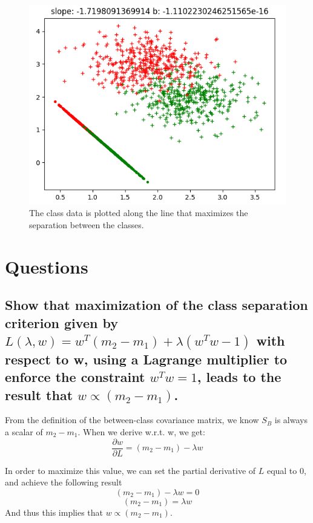\documentclass{article}
\begin{document}
			\begin{figure}
				\includegraphics[scale=0.5]{training}
					\centering
				\caption{The class data is plotted along the line that maximizes the separation 
				between the classes.}
			\end{figure}

\section{Questions}
	\subsection{Show that maximization of the class separation criterion given by 
		$L(\lambda, w) = w^{T}(m_{2} - m_{1})  + \lambda(w^{T}w - 1)$ with respect to w, using a
		Lagrange multiplier to enforce the constraint $w^{T}w = 1$, leads to the result that 
		$w \propto (m_{2} - m_{1})$.}
		
		From the definition of the between-class covariance matrix, we know $S_{B}$ is always 
		a scalar of $m_{2} - m_{1}$. When we derive w.r.t. w, we get:
		\[\frac{\partial w}{\partial L} = (m_{2} - m_{1}) - \lambda w\]
		
		In order to maximize this value, we can set the partial derivative of $L$ equal to 0,
		and achieve the following result
		\[ (m_{2} - m_{1}) - \lambda w = 0\]
		\[ (m_{2} - m_{1}) = \lambda w \]
		And thus this implies that $w \propto (m_{2} - m_{1})$. 
\end{document}
